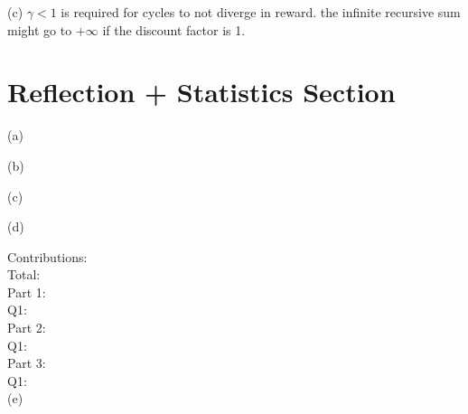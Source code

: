 \documentclass{report}
\begin{document}
(c)
\(\gamma<1\) is required for cycles to not diverge in reward. the infinite recursive sum might go to \(+\infty\) if the discount factor is 1. 


\section*{Reflection + Statistics Section}
(a)

(b) 

(c) 

(d) 

Contributions: \\



Total: \\

Part 1: \\
Q1: \\

Part 2: \\
Q1: \\

Part 3: \\
Q1: \\

(e)
\end{document}
